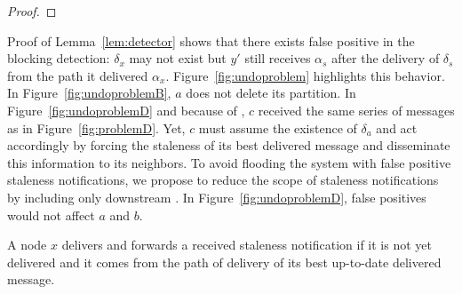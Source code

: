 \begin{proof}
\end{proof}

Proof of Lemma~\ref{lem:detector} shows that there exists false
positive in the blocking detection: $\delta_x$ may not exist but $y'$
still receives $\alpha_s$ after the delivery of $\delta_s$ from the
path it delivered $\alpha_x$. Figure~\ref{fig:undoproblem} highlights
this behavior. In Figure~\ref{fig:undoproblemB}, $a$ does not delete
its partition. In Figure~\ref{fig:undoproblemD} and because of \NAMEB,
$c$ received the same series of messages as in
Figure~\ref{fig:problemD}. Yet, $c$ must assume the existence of
$\delta_a$ and act accordingly by forcing the staleness of its best
delivered message and disseminate this information to its neighbors.
To avoid flooding the system with false positive staleness
notifications, we propose to reduce the scope of staleness
notifications by including only downstream \processes. In
Figure~\ref{fig:undoproblemD}, false positives would not affect $a$
and $b$.

\begin{definition}
    A node $x$ delivers and forwards a
  received staleness notification if it is not yet delivered and it
  comes from the path of delivery of its best up-to-date delivered
  message. 
\end{definition}

